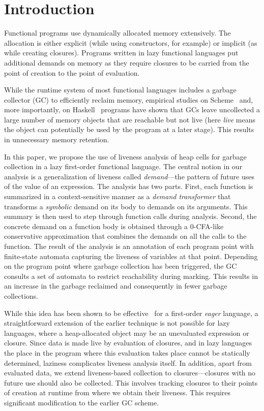 \documentclass[9pt]{sigplanconf}
\begin{document}
\section{Introduction}
\label{sec:intro}

Functional programs use dynamically allocated memory extensively.  The
allocation  is either  explicit (while using  constructors, for example) or
implicit (as while creating  closures).  Programs  written in  lazy
functional languages put additional  demands on memory as they require
closures to  be carried  from the  point of creation  to the  point of
evaluation.

While  the runtime  system  of most  functional  languages includes  a
garbage  collector  (GC)  to  efficiently  reclaim  memory,  empirical
studies on Scheme~\cite{karkare06effectiveness} and, more importantly,
on  Haskell~\cite{rojemo96lag}  programs  have shown  that  GCs  leave
uncollected a  large number of  memory objects that are  reachable but
not live (here {\em live} means  the object can potentially be used by
the program  at a  later stage).  This  results in  unnecessary memory
retention.

In this paper,  we propose the use of liveness  analysis of heap cells
for garbage collection in a lazy first-order functional language.  The
central notion in our analysis  is a generalization of liveness called
{\em  demand}---the  pattern  of  future  uses  of  the  value  of  an
expression.   The analysis  has two  parts.  First,  each function  is
summarized in a context-sensitive manner as a {\em demand transformer}
that transforms a {\em symbolic} demand  on its body to demands on its
arguments.  This summary  is then used to step  through function calls
during analysis.   Second, the concrete  demand on a function  body is
obtained through a 0-CFA-like conservative approximation that combines
the  demands on  all the  calls to  the function.   The result  of the
analysis  is an  annotation of  each program  point with  finite-state
automata capturing the liveness of  variables at that point. Depending
on the program point where  garbage collection has been triggered, the
GC consults a set of  automata to restrict reachability during marking.
This results in an increase  in the garbage reclaimed and consequently
in fewer garbage collections.

While this idea has been shown to be effective~\cite{asati14lgc} for a
first-order {\em  eager} language, a straightforward  extension of the
earlier  technique  is  not  possible  for  lazy  languages,  where  a
heap-allocated   object   may   be  an   unevaluated   expression   or
closure. Since  data is made  live by  evaluation of closures,  and in
lazy languages  the place in  the program where this  evaluation takes
place cannot  be statically determined, laziness  complicates liveness
analysis itself.   In addition, apart  from evaluated data,  we extend
liveness-based collection  to closures---closures  with no  future use
should also  be collected.  This  involves tracking closures  to their
points of  creation at  runtime from where  we obtain  their liveness.
This requires significant modification to the earlier GC scheme.
\end{document}
